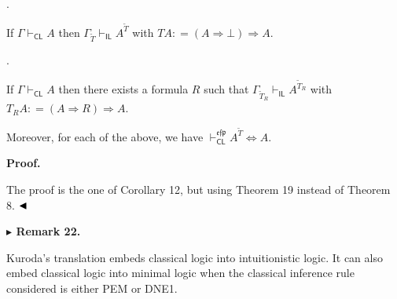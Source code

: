  
 
\par{}. 
 
If $\Gamma\vdash_{\mathsf{CL}}A$ then $\Gamma_{\widetilde{T}}\vdash_{\mathsf{IL}}A^{\widetilde{T}}$ with $TA\mathrel{\mathop{:}}=(A\mathbin{\Rightarrow}\bot)\mathbin{\Rightarrow}A$.\par
 
 
 
\par{}. 
 
If $\Gamma\vdash_{\mathsf{CL}}A$ then there exists a formula $R$ such that $\Gamma_{\widetilde{T}_{R}}\vdash_{\mathsf{IL}}A^{\widetilde{T}_{R}}$ with $T_{R}A\mathrel{\mathop{:}}=(A\mathbin{\Rightarrow}R)\mathbin{\Rightarrow}A$.\par
 
 
  
Moreover, for each of the above, we have $\vdash_{\mathsf{CL}}^{\mathfrak{e}\mathfrak{f}\mathfrak{p}}A^{\widetilde{T}}\Leftrightarrow
A$.\par
 
 
 
 
\par\medskip\noindent\textbf{Proof.}\par
 
 
The proof is the one of Corollary 12, but using Theorem 19 instead of Theorem 8. $\hfill\blacktriangleleft$\par
 
 
 
\par\medskip\noindent\textbf{$\blacktriangleright$ Remark 22.}\par
 
 
Kuroda’s translation embeds classical logic into intuitionistic logic. It can also embed classical logic into minimal logic when the classical inference rule considered is either PEM or DNE1.\par
 
 
 

